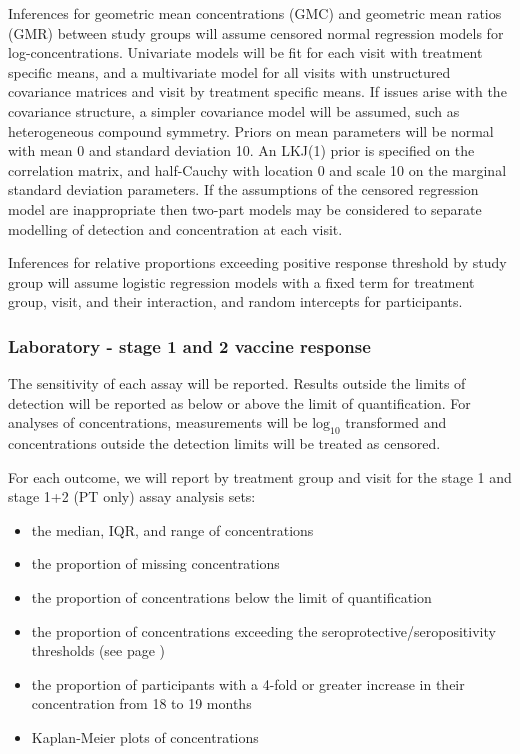 \documentclass{bmcart}
\begin{document}
Inferences for geometric mean concentrations (GMC) and geometric mean ratios (GMR) between study groups will assume censored normal regression models for log-concentrations. 
Univariate models will be fit for each visit with treatment specific means, and a multivariate model for all visits with unstructured covariance matrices and visit by treatment specific means.
If issues arise with the covariance structure, a simpler covariance model will be assumed, such as heterogeneous compound symmetry.
Priors on mean parameters will be normal with mean 0 and standard deviation 10. 
An LKJ(1) prior is specified on the correlation matrix, and half-Cauchy with location 0 and scale 10 on the marginal standard deviation parameters.
If the assumptions of the censored regression model are inappropriate then two-part models may be considered to separate modelling of detection and concentration at each visit.

Inferences for relative proportions exceeding positive response threshold by study group will assume logistic regression models with a fixed term for treatment group, visit, and their interaction, and random intercepts for participants.

\subsubsection*{Laboratory - stage 1 and 2 vaccine response}

The sensitivity of each assay will be reported. 
Results outside the limits of detection will be reported as below or above the limit of quantification.  
For analyses of concentrations, measurements will be $\text{log}_{10}$ transformed and concentrations outside the detection limits will be treated as censored.

For each outcome, we will report by treatment group and visit for the stage 1 and stage 1+2 (PT only) assay analysis sets:
\begin{itemize}
	\item the median, IQR, and range of concentrations
	\item the proportion of missing concentrations
	\item the proportion of concentrations below the limit of quantification
	\item the proportion of concentrations exceeding the seroprotective/seropositivity thresholds (see page \pageref{lab:sero-thresholds})
	\item the proportion of participants with a 4-fold or greater increase in their concentration from 18 to 19 months 
	\item Kaplan-Meier plots of concentrations
\end{itemize}
\end{document}
